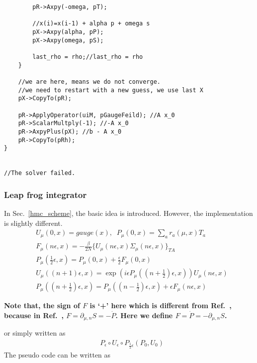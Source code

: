 \begin{lstlisting}
        pR->Axpy(-omega, pT);

        //x(i)=x(i-1) + alpha p + omega s
        pX->Axpy(alpha, pP);
        pX->Axpy(omega, pS);

        last_rho = rho;//last_rho = rho
    }

    //we are here, means we do not converge.
    //we need to restart with a new guess, we use last X
    pX->CopyTo(pR);

    pR->ApplyOperator(uiM, pGaugeFeild); //A x_0
    pR->ScalarMultply(-1); //-A x_0
    pR->AxpyPlus(pX); //b - A x_0
    pR->CopyTo(pRh);
}


//The solver failed.

\end{lstlisting}


\subsubsection{\label{Leap frog}Leap frog integrator}

In Sec.~\ref{hmc_scheme}, the basic idea is introduced. However, the implementation is slightly different.
\begin{subequations}
\begin{eqnarray}
&U_{\mu}(0,x)=gauge(x),\;\;P_{\mu}(0,x)=\sum _{a}r_a(\mu,x)T_a\\
&F_{\mu}(n\epsilon,x)=-\frac{\beta}{2N}\{U_{\mu}(n\epsilon,x)\Sigma _{\mu}(n\epsilon,x)\}_{TA}\\
&P_{\mu}(\frac{1}{2}\epsilon,x)=P_{\mu}(0,x)+\frac{\epsilon}{2}F_{\mu}(0,x)\\
&U_{\mu}((n+1)\epsilon,x)=\exp \left(i\epsilon P_{\mu}((n+\frac{1}{2})\epsilon,x)\right)U_{\mu}(n\epsilon,x)\\
&P_{\mu}((n+\frac{1}{2})\epsilon,x)=P_{\mu}((n-\frac{1}{2})\epsilon,x)+\epsilon F_{\mu}(n\epsilon,x)
\end{eqnarray}
\label{eq.hmc.update_leapfrog}
\end{subequations}

\textcolor[rgb]{0,0,1}{\textbf{Note that, the sign of $F$ is `+' here which is different from Ref.~\cite{latticeqcdbook2010}, because in Ref.~\cite{latticeqcdbook2010}, $F=\partial _{\mu,n}S = -\dot{P}$. Here we define $F=\dot{P}=-\partial _{\mu,n}S$.}}

or simply written as
\begin{equation}
\begin{split}
&P_{\epsilon}\circ U_{\epsilon}\circ P_{\frac{1}{2}\epsilon}\left(P_0,U_0\right)
\end{split}
\label{eq.hmc.update_leapfrog2}
\end{equation}
The pseudo code can be written as

